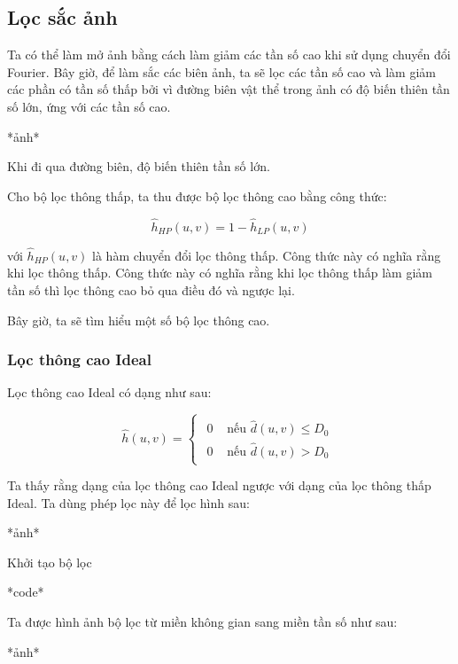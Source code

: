 \documentclass[12pt,a4paper]{report}
\numberwithin{equation}{section}
\theoremstyle{definition} %
\begin{document}
\subsection{Lọc sắc ảnh}

Ta có thể làm mở ảnh bằng cách làm giảm các tần số cao khi sử dụng chuyển đổi Fourier. Bây giờ, để làm sắc các biên ảnh, ta sẽ lọc các tần số cao và làm giảm các phần có tần số thấp bởi vì đường biên vật thể trong ảnh có độ biến thiên tần số lớn, ứng với các tần số cao.

*ảnh*

Khi đi qua đường biên, độ biến thiên tần số lớn.

Cho bộ lọc thông thấp, ta thu được bộ lọc thông cao bằng công thức:

\begin{equation}
    \hat{h}_{HP}(u,v) = 1 - \hat{h}_{LP}(u,v)
\end{equation}

với $\hat{h}_{HP}(u,v)$ là hàm chuyển đổi lọc thông thấp. Công thức này có nghĩa rằng khi lọc thông thấp. Công thức này có nghĩa rằng khi lọc thông thấp làm giảm tần số thì lọc thông cao bỏ qua điều đó và ngược lại.

Bây giờ, ta sẽ tìm hiểu một số bộ lọc thông cao.

\subsubsection{Lọc thông cao Ideal}

Lọc thông cao Ideal có dạng như sau:

\begin{equation}
    \hat{h}(u,v)=\begin{cases}
    \begin{aligned}
        0& \text{ nếu }  \hat{d}(u,v) \le D_0\\
        0& \text{ nếu }  \hat{d}(u,v) > D_0
    \end{aligned}
\end{cases}
\end{equation}


Ta thấy rằng dạng của lọc thông cao Ideal ngược với dạng của lọc thông thấp Ideal. Ta dùng phép lọc này để lọc hình sau: 

*ảnh*

Khởi tạo bộ lọc 

*code*

Ta được hình ảnh bộ lọc từ miền không gian sang miền tần số như sau:

*ảnh*
\end{document}
